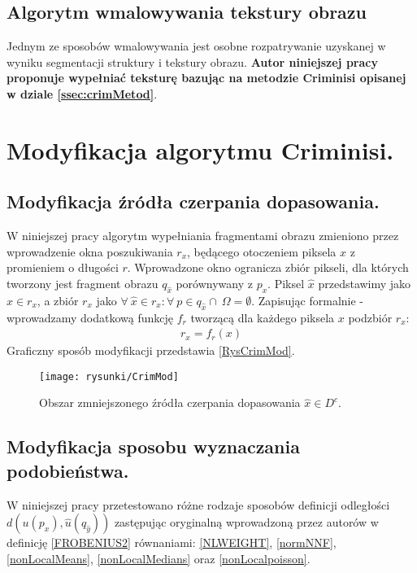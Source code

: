 \documentclass[12pt, twoside, openany]{report}
\theoremstyle{definition}
\begin{document}
\subsection{Algorytm wmalowywania tekstury obrazu}
Jednym ze sposobów wmalowywania jest osobne rozpatrywanie uzyskanej w wyniku segmentacji struktury i tekstury obrazu. \textbf{Autor niniejszej pracy proponuje wypełniać teksturę bazując na metodzie Criminisi opisanej w dziale \ref{ssec:crimMetod}}.
\section{Modyfikacja algorytmu Criminisi.}
\label{ssec:crimMod}
\subsection{Modyfikacja źródła czerpania dopasowania.}
\label{ssec:crimModSource}
W niniejszej pracy algorytm wypełniania fragmentami obrazu zmieniono przez wprowadzenie okna poszukiwania $r_x$, będącego otoczeniem piksela $x$ z promieniem o długości $r$. Wprowadzone okno ogranicza zbiór pikseli, dla których tworzony jest fragment obrazu $q_{\hat{x}}$ porównywany z $p_{x}$.
Piksel $\hat{x}$ przedstawimy jako $\hat{x} \in r_x$, a zbiór $r_x$ jako 
$\forall \ \hat{x} \in r_x: \forall \ p \in q_{\hat{x}} \cap \ \Omega = \emptyset$. Zapisując formalnie - wprowadzamy dodatkową funkcję $f_r$ tworzącą dla każdego piksela $x$ podzbiór $r_x$:
\begin{align}
r_x = f_r(x)
\end{align}
Graficzny sposób modyfikacji przedstawia \autoref{RysCrimMod}.
\begin{figure}[!h]
	\centering
	\texttt{[image: rysunki/CrimMod]}
	\caption{Obszar zmniejszonego źródła czerpania dopasowania $\hat{x} \in D^c$.}
\label{RysCrimMod}
\end{figure}
\subsection{Modyfikacja sposobu wyznaczania podobieństwa.}
W niniejszej pracy przetestowano różne rodzaje sposobów definicji odległości $d\left( u(p_x), \hat{u} (q_{\hat{y}}) \right)$  zastępując oryginalną wprowadzoną przez autorów w \cite{criminisi2004region} definicję \eqref{FROBENIUS2} równaniami: \eqref{NLWEIGHT}, \eqref{normNNF}, \eqref{nonLocalMeans}, \eqref{nonLocalMedians} oraz \eqref{nonLocalpoisson}.
\end{document}

